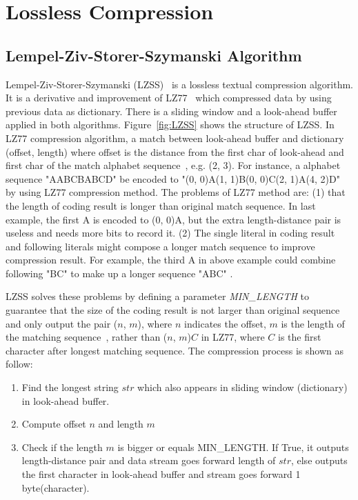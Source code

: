 \section{Lossless Compression}
\label{sec:lossless}

\subsection{Lempel-Ziv-Storer-Szymanski Algorithm}
Lempel-Ziv-Storer-Szymanski (LZSS)~\cite{storer1982data} is a lossless textual
compression algorithm.  It is a derivative and improvement of
LZ77~\cite{ziv1977universal} which  compressed data by using previous data as
dictionary. There is a sliding window and a look-ahead buffer applied in both
algorithms. Figure~\ref{fig:LZSS} shows the structure of LZSS. In LZ77
compression algorithm, a match between look-ahead buffer and dictionary  (offset, length) where
offset is the distance from the first char of look-ahead and first char of the
match alphabet sequence~\cite{ziv1977universal}, e.g. (2, 3). For instance, a
alphabet sequence "AABCBABCD"  be encoded to "(0, 0)A(1, 1)B(0, 0)C(2,
1)A(4, 2)D"  by using LZ77 compression method.
The problems of LZ77 method are: (1)  that the length of
coding result is longer than original match sequence. In last example, the first
A is encoded to (0, 0)A, but the extra length-distance pair is useless and needs
more bits to record it. (2) The single literal in coding result and following
literals might compose a longer match sequence to improve compression result.
For example, the third A in above example could combine following "BC" to make
up a longer sequence "ABC" . 


LZSS solves these problems by defining a parameter \emph{MIN\_LENGTH} to
guarantee that the size of the coding result is not larger than original sequence and
only output the pair ($n$, $m$), where $n$ indicates the offset, $m$ is the
length of the matching sequence~\cite{storer1982data}, rather than ($n$, $m$)$C$
in LZ77, where $C$ is the first character after longest matching sequence. The
compression process is shown as follow:

\begin{enumerate}
    \item Find the longest string $str$ which also appears in sliding
    window (dictionary) in look-ahead buffer.
    \item Compute offset $n$ and length $m$
    \item Check if the length $m$ is bigger or equals MIN\_LENGTH. If True, it
    outputs length-distance pair and data stream goes forward length of $str$,
    else outputs the first character in look-ahead buffer and stream goes
    forward 1 byte(character).
\end{enumerate}

